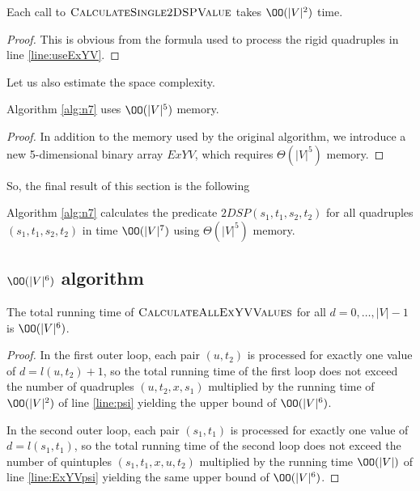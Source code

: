 \begin{proposition} \label{n7_rt2}
Each call to $\textsc{CalculateSingle2DSPValue}$ takes $\OO(|V|^2)$ time.
\end{proposition}
\begin{proof}
This is obvious from the formula used to process the rigid quadruples in line \ref{line:useExYV}.
\end{proof}

Let us also estimate the space complexity.

\begin{proposition} \label{n7_m}
Algorithm \ref{alg:n7} uses $\OO(|V|^5)$ memory.
\end{proposition}
\begin{proof}
In addition to the memory used by the original algorithm, we introduce a new 5-dimensional binary array $ExYV$, which requires $\Theta(|V|^5)$ memory.
\end{proof}

So, the final result of this section is the following
\begin{theorem}
Algorithm \ref{alg:n7} calculates the predicate $2DSP(s_1, t_1, s_2, t_2)$ for all quadruples $(s_1, t_1, s_2, t_2)$ in time $\OO(|V|^7)$ using $\Theta(|V|^5)$ memory. 
\end{theorem}

\subsection{$\OO(|V|^6)$ algorithm}

\begin{proposition}
The total running time of $\textsc{CalculateAllExYVValues}$ for all $d = 0, \ldots, |V|-1$ is $\OO(|V|^6)$. 
\end{proposition}
\begin{proof}
In the first outer loop, each pair $(u, t_2)$ is processed for exactly one value of $d = l(u, t_2) + 1$, so the total running time of the first loop does not exceed the number of quadruples $(u, t_2, x, s_1)$ multiplied by the running time of $\OO(|V|^2)$ of line \ref{line:psi} yielding the upper bound of $\OO(|V|^6)$.

In the second outer loop, each pair $(s_1, t_1)$ is processed for exactly one value of $d = l(s_1, t_1)$, so the total running time of the second loop does not exceed the number of quintuples $(s_1, t_1, x, u, t_2)$ multiplied by the running time $\OO(|V|)$ of line \ref{line:ExYVpsi} yielding the same upper bound of $\OO(|V|^6)$.
\end{proof}

